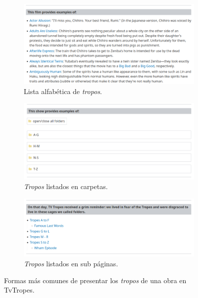 \begin{figure}[!h]
    \centering
    \begin{subfigure}{\textwidth}
      \includegraphics[width=\linewidth]{img/tropes1.png}
      \caption{Lista alfabética de \textit{tropos}.}
      \label{fig:tropelist1}
    \end{subfigure}
    \begin{subfigure}{\textwidth}
      \includegraphics[width=\linewidth]{img/tropes2.png}
      \caption{\textit{Tropos} listados en carpetas.}
      \label{fig:tropelist2}
    \end{subfigure}
    \begin{subfigure}{\textwidth}%
      \includegraphics[width=\linewidth]{img/tropes3.png}
      \caption{\textit{Tropos} listados en sub páginas.}
      \label{fig:tropelist3}
    \end{subfigure}
    \caption{Formas más comunes de presentar los \textit{tropos}
    de una obra en TvTropes.}
    \label{fig:tropelist}
\end{figure}

